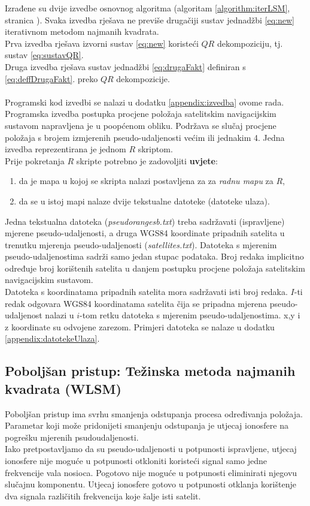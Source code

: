 \documentclass[a4paper,twoside,12pt]{memoir} %
\begin{document}
Izrađene su dvije izvedbe osnovnog algoritma (algoritam \ref{algorithm:iterLSM}, stranica \pageref{algorithm:iterLSM}). Svaka izvedba rješava ne previše drugačiji
sustav jednadžbi \ref{eq:new} iterativnom metodom najmanih kvadrata.\\
Prva izvedba rješava izvorni sustav \ref{eq:new} koristeći $QR$ dekompoziciju, tj. sustav \ref{eq:sustavQR}.\\
Druga izvedba rješava sustav jednadžbi \ref{eq:drugaFakt} definiran s \ref{eq:deffDrugaFakt}.
preko $QR$ dekompozicije.\\
\vspace{0.05cm}\\
Programski kod izvedbi se nalazi u dodatku \ref{appendix:izvedba} ovome rada.\\
Programska izvedba postupka procjene položaja satelitskim navigacijskim sustavom napravljena je u poopćenom obliku. Podržava se slučaj procjene položaja s brojem izmjerenih pseudo-udaljenosti većim ili jednakim 4.
Jedna izvedba reprezentirana je jednom $R$ skriptom.\\
Prije pokretanja $R$ skripte  potrebno je zadovoljiti \textbf{uvjete}:%
\begin{enumerate}\label{run:zahtjevi}
	\item da je mapa u kojoj se skripta nalazi postavljena za za \textit{radnu mapu} za $R$,%
	\item da se u istoj mapi nalaze dvije tekstualne datoteke (datoteke ulaza).%
\end{enumerate}%
Jedna tekstualna datoteka (\textit{pseudorangesb.txt}) treba sadržavati (ispravljene) mjerene pseudo-udaljenosti, a druga WGS84 koordinate pripadnih satelita u trenutku mjerenja pseudo-udaljenosti (\textit{satellites.txt}).
Datoteka s mjerenim pseudo-udaljenostima sadrži samo jedan stupac podataka. Broj redaka implicitno određuje broj korištenih satelita u danjem postupku procjene položaja satelitskim navigacijskim sustavom.\\
Datoteka s koordinatama pripadnih satelita mora sadržavati isti broj redaka. $I$-ti redak odgovara
WGS84 koordinatama satelita čija se pripadna mjerena pseudo-udaljenost nalazi u $i$-tom retku
datoteka s mjerenim pseudo-udaljenostima.
x,y i z koordinate su odvojene zarezom. Primjeri datoteka se nalaze 
u dodatku \ref{appendix:datotekeUlaza}.



\subsection{Poboljšan pristup: Težinska metoda najmanih kvadrata (WLSM)}\label{sec:algTezine}%
Poboljšan pristup ima svrhu smanjenja odstupanja procesa određivanja položaja.
Parametar koji može pridonijeti smanjenju odstupanja je utjecaj ionosfere na pogrešku mjerenih psudoudaljenosti.\\
Iako pretpostavljamo da su pseudo-udaljenosti u potpunosti ispravljene, utjecaj ionosfere nije moguće u potpunosti otkloniti koristeći signal samo jedne frekvencije vala nosioca. Pogotovo nije moguće u potpunosti eliminirati njegovu slučajnu komponentu.
Utjecaj ionosfere gotovo u potpunosti otklanja korištenje dva signala različitih frekvencija koje šalje isti satelit. 
\end{document}
